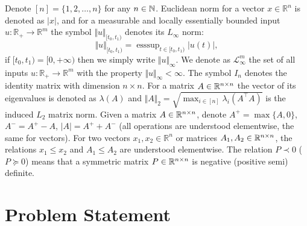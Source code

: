 \documentclass[letterpaper, 10 pt, conference]{ieeeconf}  %
\begin{document}
Denote $[n]=\{1,2,\dots,n\}$ for any $n\in\mathbb{N}$. Euclidean norm for a vector $x\in\mathbb{R}^{n}$ is denoted
as $|x|$, and for a measurable and locally essentially bounded input
$u:\mathbb{R}_{+}\to\mathbb{R}^{m}$ the symbol $\Vert u\Vert_{[t_{0},t_{1})}$
denotes its $L_{\infty}$ norm:
$$\Vert u\Vert_{[t_{0},t_{1})}={\text{ess}\sup}_{t\in[t_{0},t_{1})}|u(t)|,$$
if $[t_{0},t_{1})=[0,+\infty)$ then we simply write $\Vert u\Vert_{\infty}$.
We denote as $\mathcal{L}_{\infty}^{m}$ the set of all inputs
$u:\mathbb{R}_{+}\to\mathbb{R}^{m}$ with the property $\Vert u\Vert_{\infty}<\infty$.
The symbol $I_{n}$ denotes the identity matrix with dimension $n\times n$.
For a matrix $A\in\mathbb{R}^{n\times n}$ the vector of its eigenvalues
is denoted as $\lambda(A)$ and $\Vert A\Vert_{2}=\sqrt{\max_{i\in[n]}\lambda_{i}(A^{\top}A)}$
is the induced $L_{2}$ matrix norm.
Given a matrix $A\in\mathbb{R}^{n\times n}$, denote $A^{+}=\max\{A,0\}$,
$A^{-}=A^{+}-A$, $|A|=A^{+}+A^{-}$ (all operations are understood
elementwise, the same for vectors). 
For two vectors $x_{1},x_{2}\in\mathbb{R}^{n}$ or matrices $A_{1},A_{2}\in\mathbb{R}^{n\times n}$,
the relations $x_{1}\le x_{2}$ and $A_{1}\le A_{2}$ are understood
elementwise. 
The relation $P\prec0$ ($P\succeq0$) means that a symmetric matrix
$P\in\mathbb{R}^{n\times n}$ is negative (positive semi) definite.

\section{\label{sec:Problem} Problem Statement}
\end{document}
